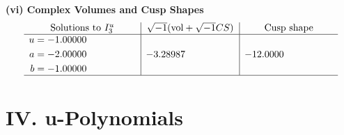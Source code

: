 \documentclass[1p]{elsarticle_modified}
\theoremstyle{definition}
\newcommand{\I}{\sqrt{-1}}
\begin{document}
\newpage\flushleft \textbf{(vi) Complex Volumes and Cusp Shapes}
$$\begin{array}{c|c|c}  
\text{Solutions to }I^u_{3}& \I (\text{vol} + \sqrt{-1}CS) & \text{Cusp shape}\\
 \hline 
\begin{aligned}
u &= -1.00000\phantom{ +0.000000I} \\
a &= -2.00000\phantom{ +0.000000I} \\
b &= -1.00000\phantom{ +0.000000I}\end{aligned}
 & -3.28987\phantom{ +0.000000I} & -12.0000\phantom{ +0.000000I}\\
 \hline 
 \end{array}$$\newpage
\newpage\renewcommand{\arraystretch}{1}
\centering \section*{ IV. u-Polynomials}
\end{document}
